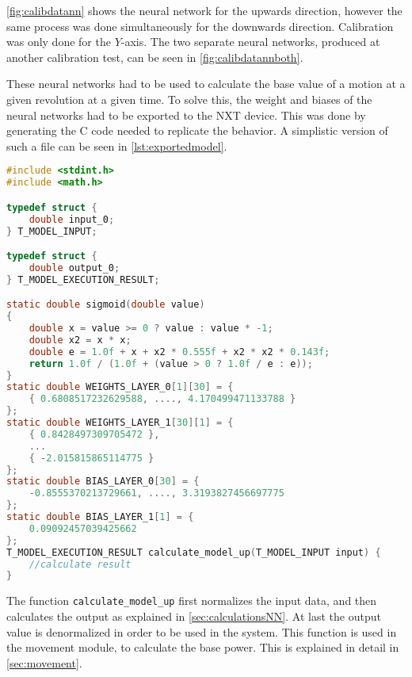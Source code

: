 
\autoref{fig:calibdatann} shows the neural network for the upwards direction, however the same process was done simultaneously for the downwards direction.
Calibration was only done for the $Y$-axis.
The two separate neural networks, produced at another calibration test, can be seen in \autoref{fig:calibdatannboth}.



These neural networks had to be used to calculate the base value of a motion at a given revolution at a given time.
To solve this, the weight and biases of the neural networks had to be exported to the NXT device.
This was done by generating the C code needed to replicate the behavior.
A simplistic version of such a file can be seen in \autoref{lst:exportedmodel}.


\begin{lstlisting}[language=C,label={lst:exportedmodel},firstnumber={1},caption={Autogenerated model for getting power to move up}]
#include <stdint.h>
#include <math.h>

typedef struct {
	double input_0;
} T_MODEL_INPUT;

typedef struct {
	double output_0;
} T_MODEL_EXECUTION_RESULT;

static double sigmoid(double value)
{
	double x = value >= 0 ? value : value * -1;
	double x2 = x * x;
	double e = 1.0f + x + x2 * 0.555f + x2 * x2 * 0.143f;
	return 1.0f / (1.0f + (value > 0 ? 1.0f / e : e));
}
static double WEIGHTS_LAYER_0[1][30] = {
	{ 0.6808517232629588, ...., 4.170499471133788 }
};
static double WEIGHTS_LAYER_1[30][1] = {
	{ 0.8428497309705472 },
	...
	{ -2.015815865114775 }
};
static double BIAS_LAYER_0[30] = {
	-0.8555370213729661, ...., 3.3193827456697775
};
static double BIAS_LAYER_1[1] = {
	0.09092457039425662
};
T_MODEL_EXECUTION_RESULT calculate_model_up(T_MODEL_INPUT input) {
	//calculate result
}

\end{lstlisting}
The function \texttt{calculate\_model\_up} first normalizes the input data, and then calculates the output as explained in \ref{sec:calculationsNN}.
At last the output value is denormalized in order to be used in the system.
This function is used in the movement module, to calculate the base power.
This is explained in detail in \autoref{sec:movement}.


